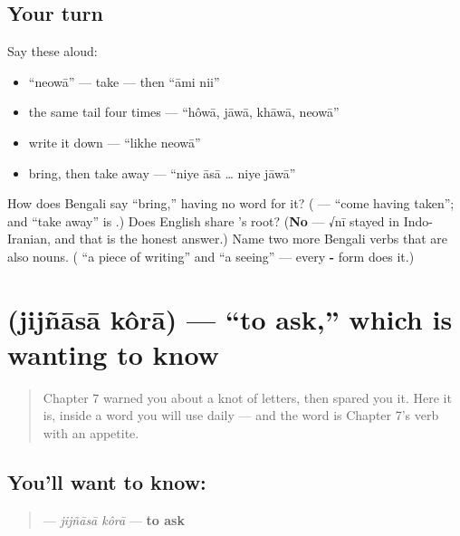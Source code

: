 \subsection*{Your turn}
Say these aloud:

\begin{itemize}
\raggedright
  \item \textquotedblleft{}neowā\textquotedblright{} — take — then \textquotedblleft{}āmi nii\textquotedblright{}
  \item the same tail four times — \textquotedblleft{}hôwā, jāwā, khāwā, neowā\textquotedblright{}
  \item write it down — \textquotedblleft{}likhe neowā\textquotedblright{}
  \item bring, then take away — \textquotedblleft{}niye āsā … niye jāwā\textquotedblright{}
\end{itemize}

\begin{tcolorbox}[breakable,colback=teal!4,colframe=teal!35!black,title={Before you move on}]
How does Bengali say \textquotedblleft{}bring,\textquotedblright{} having no word for it? (\textbf{ } — \textquotedblleft{}come having taken\textquotedblright{}; and \textquotedblleft{}take away\textquotedblright{} is  .) Does English share 's root? (\textbf{No} — √nī stayed in Indo-Iranian, and that is the honest answer.) Name two more Bengali verbs that are also nouns. (\textbf{} \textquotedblleft{}a piece of writing\textquotedblright{} and \textbf{} \textquotedblleft{}a seeing\textquotedblright{} — every \textbf{-} form does it.)
\end{tcolorbox}
\section[jijñāsā kôrā]{  (jijñāsā kôrā) — \textquotedblleft{}to ask,\textquotedblright{} which is wanting to know}

\label{lesson:BN-C09-jijnasa-kora}



\begin{quote}
Chapter 7 warned you about a knot of letters, then spared you it. Here it is, inside a word you will use daily — and the word is Chapter 7's verb with an appetite.
\end{quote}

\subsection*{You'll want to know:  }
\begin{quote}
\textbf{ } — \emph{jijñāsā kôrā} — \textbf{to ask}
\end{quote}

